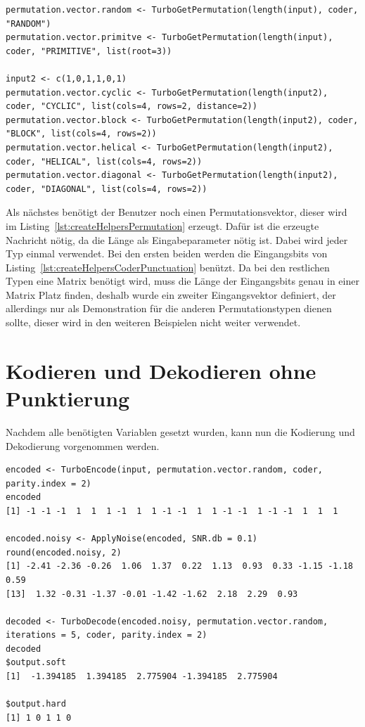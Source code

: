\begin{lstlisting}[caption=Erzeugung von verschiedenen Permutationsvektoren, label={lst:createHelpersPermutation}, float=!th]
permutation.vector.random <- TurboGetPermutation(length(input), coder, "RANDOM")
permutation.vector.primitve <- TurboGetPermutation(length(input), coder, "PRIMITIVE", list(root=3))

input2 <- c(1,0,1,1,0,1)
permutation.vector.cyclic <- TurboGetPermutation(length(input2), coder, "CYCLIC", list(cols=4, rows=2, distance=2))
permutation.vector.block <- TurboGetPermutation(length(input2), coder, "BLOCK", list(cols=4, rows=2))
permutation.vector.helical <- TurboGetPermutation(length(input2), coder, "HELICAL", list(cols=4, rows=2))
permutation.vector.diagonal <- TurboGetPermutation(length(input2), coder, "DIAGONAL", list(cols=4, rows=2))
\end{lstlisting}

Als nächstes benötigt der Benutzer noch einen Permutationsvektor, dieser wird im Listing~\ref{lst:createHelpersPermutation} erzeugt. Dafür ist die erzeugte Nachricht nötig, da die Länge als Eingabeparameter nötig ist. Dabei wird jeder Typ einmal verwendet. Bei den ersten beiden werden die Eingangsbits von Listing~\ref{lst:createHelpersCoderPunctuation} benützt. Da bei den restlichen Typen eine Matrix benötigt wird, muss die Länge der Eingangsbits genau in einer Matrix Platz finden, deshalb wurde ein zweiter Eingangsvektor definiert, der allerdings nur als Demonstration für die anderen Permutationstypen dienen sollte, dieser wird in den weiteren Beispielen nicht weiter verwendet.

\FloatBarrier
\section{Kodieren und Dekodieren ohne Punktierung}
\label{sec:example_withoutPunctuation}
Nachdem alle benötigten Variablen gesetzt wurden, kann nun die Kodierung und Dekodierung vorgenommen werden.

\begin{lstlisting}[caption=Kodierung und Dekodierung ohne Punktierung, label={lst:encodeDecodeWithoutPunctuation}, float=!th]
encoded <- TurboEncode(input, permutation.vector.random, coder, parity.index = 2)
encoded
[1] -1 -1 -1  1  1  1 -1  1  1 -1 -1  1  1 -1 -1  1 -1 -1  1  1  1

encoded.noisy <- ApplyNoise(encoded, SNR.db = 0.1)
round(encoded.noisy, 2)
[1] -2.41 -2.36 -0.26  1.06  1.37  0.22  1.13  0.93  0.33 -1.15 -1.18  0.59
[13]  1.32 -0.31 -1.37 -0.01 -1.42 -1.62  2.18  2.29  0.93

decoded <- TurboDecode(encoded.noisy, permutation.vector.random, iterations = 5, coder, parity.index = 2)
decoded
$output.soft
[1]  -1.394185  1.394185  2.775904 -1.394185  2.775904

$output.hard
[1] 1 0 1 1 0
\end{lstlisting}

